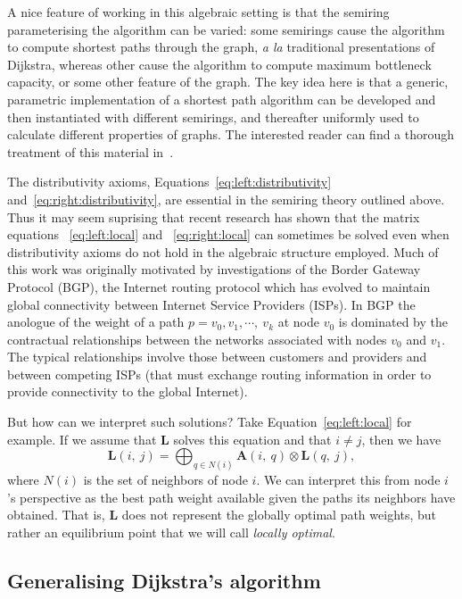 A nice feature of working in this algebraic setting is that the semiring parameterising the algorithm can be varied: some semirings cause the algorithm to compute shortest paths through the graph, \emph{a la} traditional presentations of Dijkstra, whereas other cause the algorithm to compute maximum bottleneck capacity, or some other feature of the graph.
The key idea here is that a generic, parametric implementation of a shortest path algorithm can be developed and then instantiated with different semirings, and thereafter uniformly used to calculate different properties of graphs.
The interested reader can find a thorough treatment of this material in~\cite{gondran_graphs_2008}.

The distributivity axioms,
Equations~\ref{eq:left:distributivity} and~\ref{eq:right:distributivity},
are essential in the semiring theory outlined above.
Thus it may seem suprising that recent research has shown that
the matrix equations ~\ref{eq:left:local} and ~\ref{eq:right:local}
can sometimes be solved even when
distributivity axioms do not hold in the algebraic structure employed.
Much of this work was originally motivated
by investigations of the Border Gateway Protocol (BGP),
the Internet routing protocol which has evolved to
maintain global connectivity between Internet Service Providers (ISPs).
In BGP the anologue of the weight of a path
$p = v_0, v_1, \cdots,\ v_k$ at node $v_0$
is dominated by the contractual relationships between
the networks associated with nodes $v_0$ and $v_1$.
The typical relationships involve those between customers
and providers and between competing ISPs (that must exchange
routing information in order to provide connectivity to
the global Internet).

But how can we interpret such solutions?
Take Equation~\ref{eq:left:local} for example.
If we assume that $\mathbf{L}$ solves this equation
and that $i \neq j$, then we have
\begin{equation}
\label{eq:left:local:at:i}
\mathbf{L}(i,\ j) = \displaystyle\bigoplus_{q \in N(i)} \mathbf{A}(i,\ q) \otimes \mathbf{L}(q,\ j),
\end{equation}
where $N(i)$ is the set of neighbors of node $i$.
We can interpret this from node $i$'s perspective as
the best path weight available given the paths its neighbors
have obtained.
That is, $\mathbf{L}$ does not represent the globally optimal
path weights, but rather an equilibrium point that we will
call \emph{locally optimal}.

\subsection{Generalising Dijkstra's algorithm}

